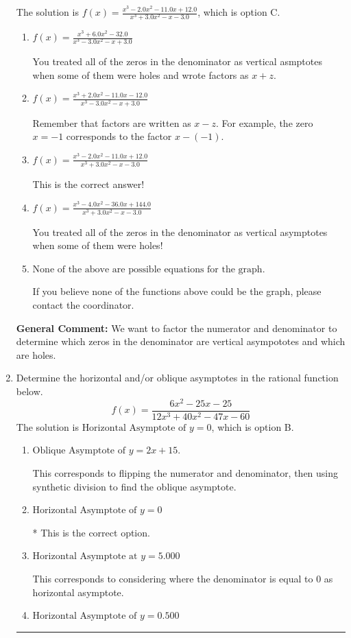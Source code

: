 \documentclass{extbook}[14pt]
\newcommand{\litem}[1]{\item #1

\rule{\textwidth}{0.4pt}}
\begin{document}
\begin{enumerate}
{The solution is \( f(x)=\frac{x^{3} -2.0 x^{2} -11.0 x + 12.0}{x^{3} +3.0 x^{2} -x -3.0} \), which is option C.\begin{enumerate}[label=\Alph*.]
\item \( f(x)=\frac{x^{3} +6.0 x^{2} -32.0}{x^{3} -3.0 x^{2} -x + 3.0} \)

You treated all of the zeros in the denominator as vertical asmptotes when some of them were holes and wrote factors as $x+z$.
\item \( f(x)=\frac{x^{3} +2.0 x^{2} -11.0 x -12.0}{x^{3} -3.0 x^{2} -x + 3.0} \)

Remember that factors are written as $x-z$. For example, the zero $x=-1$ corresponds to the factor $x-(-1)$.
\item \( f(x)=\frac{x^{3} -2.0 x^{2} -11.0 x + 12.0}{x^{3} +3.0 x^{2} -x -3.0} \)

This is the correct answer!
\item \( f(x)=\frac{x^{3} -4.0 x^{2} -36.0 x + 144.0}{x^{3} +3.0 x^{2} -x -3.0} \)

You treated all of the zeros in the denominator as vertical asymptotes when some of them were holes!
\item \( \text{None of the above are possible equations for the graph.} \)

If you believe none of the functions above could be the graph, please contact the coordinator.
\end{enumerate}

\textbf{General Comment:} We want to factor the numerator and denominator to determine which zeros in the denominator are vertical asympototes and which are holes.
}
\litem{
Determine the horizontal and/or oblique asymptotes in the rational function below.
\[ f(x) = \frac{6x^{2} -25 x -25}{12x^{3} +40 x^{2} -47 x -60} \]The solution is \( \text{Horizontal Asymptote of } y = 0 \), which is option B.\begin{enumerate}[label=\Alph*.]
\item \( \text{Oblique Asymptote of } y = 2x + 15. \)

This corresponds to flipping the numerator and denominator, then using synthetic division to find the oblique asymptote.
\item \( \text{Horizontal Asymptote of } y = 0 \)

* This is the correct option.
\item \( \text{Horizontal Asymptote at } y = 5.000 \)

This corresponds to considering where the denominator is equal to 0 as horizontal asymptote.
\item \( \text{Horizontal Asymptote of } y = 0.500  \)


\end{enumerate}}
\end{enumerate}
\end{document}
